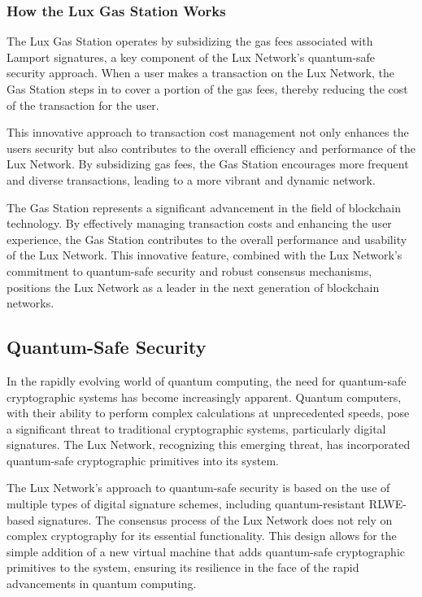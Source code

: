 \documentclass[11pt]{article}
\begin{document}
\subsubsection{How the Lux Gas Station Works}

The Lux Gas Station operates by subsidizing the gas fees associated with Lamport signatures, a key component of the Lux Network's quantum-safe security approach. When a user makes a transaction on the Lux Network, the Gas Station steps in to cover a portion of the gas fees, thereby reducing the cost of the transaction for the user.


This innovative approach to transaction cost management not only enhances the users security but also contributes to the overall efficiency and performance of the Lux Network. By subsidizing gas fees, the Gas Station encourages more frequent and diverse transactions, leading to a more vibrant and dynamic network.


The Gas Station represents a significant advancement in the field of blockchain technology. By effectively managing transaction costs and enhancing the user experience, the Gas Station contributes to the overall performance and usability of the Lux Network. This innovative feature, combined with the Lux Network's commitment to quantum-safe security and robust consensus mechanisms, positions the Lux Network as a leader in the next generation of blockchain networks.


\subsection{Quantum-Safe Security}

In the rapidly evolving world of quantum computing, the need for quantum-safe cryptographic systems has become increasingly apparent. Quantum computers, with their ability to perform complex calculations at unprecedented speeds, pose a significant threat to traditional cryptographic systems, particularly digital signatures. The Lux Network, recognizing this emerging threat, has incorporated quantum-safe cryptographic primitives into its system.


The Lux Network's approach to quantum-safe security is based on the use of multiple types of digital signature schemes, including quantum-resistant RLWE-based signatures. The consensus process of the Lux Network does not rely on complex cryptography for its essential functionality. This design allows for the simple addition of a new virtual machine that adds quantum-safe cryptographic primitives to the system, ensuring its resilience in the face of the rapid advancements in quantum computing.
\end{document}
